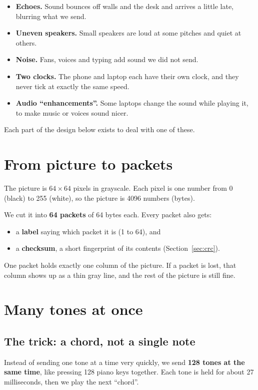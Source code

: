 \documentclass[12pt,a4paper]{article}
\begin{document}
\begin{itemize}
\item \textbf{Echoes.} Sound bounces off walls and the desk and arrives a little late, blurring what we send.
\item \textbf{Uneven speakers.} Small speakers are loud at some pitches and quiet at others.
\item \textbf{Noise.} Fans, voices and typing add sound we did not send.
\item \textbf{Two clocks.} The phone and laptop each have their own clock, and they never tick at exactly the same speed.
\item \textbf{Audio ``enhancements''.} Some laptops change the sound while playing it, to make music or voices sound nicer.
\end{itemize}

Each part of the design below exists to deal with one of these.

\section{From picture to packets}

The picture is $64\times64$ pixels in grayscale. Each pixel is one number from
0 (black) to 255 (white), so the picture is 4096 numbers (bytes).

We cut it into \textbf{64 packets} of 64 bytes each. Every packet also gets:
\begin{itemize}
\item a \textbf{label} saying which packet it is (1 to 64), and
\item a \textbf{checksum}, a short fingerprint of its contents (Section~\ref{sec:crc}).
\end{itemize}

One packet holds exactly one column of the picture. If a packet is lost, that
column shows up as a thin gray line, and the rest of the picture is still fine.

\section{Many tones at once}

\subsection{The trick: a chord, not a single note}
Instead of sending one tone at a time very quickly, we send \textbf{128 tones at
the same time}, like pressing 128 piano keys together. Each tone is held for
about 27 milliseconds, then we play the next ``chord''.
\end{document}
